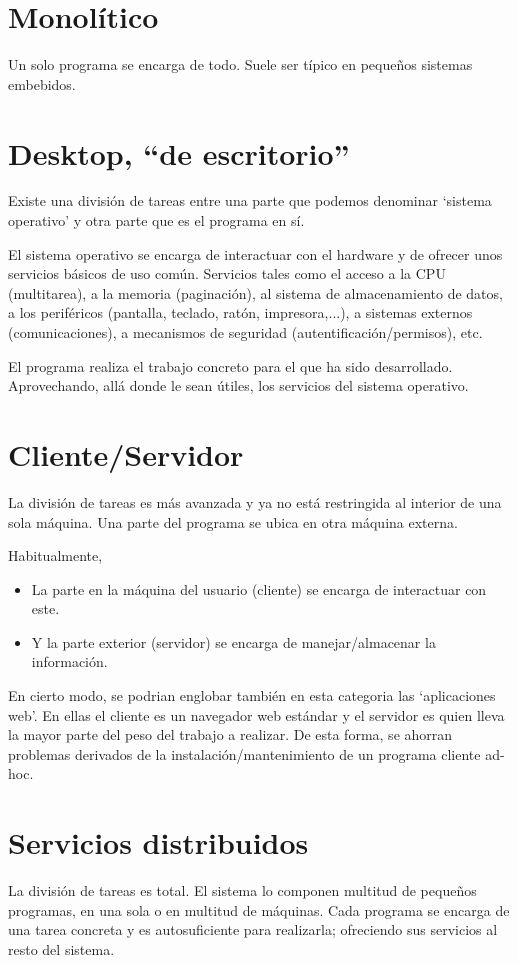 \documentclass[spanish,12pt,a4paper,final,oneside]{book}
\begin{document}
\section{Monolítico}
Un solo programa se encarga de todo. Suele ser típico en pequeños sistemas embebidos.

\section{Desktop, ``de escritorio''}
Existe una división de tareas entre una parte que podemos denominar `sistema operativo' y otra parte que es el programa en sí.

El sistema operativo se encarga de interactuar con el hardware y de ofrecer unos servicios básicos de uso común. Servicios tales como el acceso a la CPU (multitarea), a la memoria (paginación), al sistema de almacenamiento de datos, a los periféricos (pantalla, teclado, ratón, impresora,...), a sistemas externos (comunicaciones), a mecanismos de seguridad (autentificación/permisos), etc.

El programa realiza el trabajo concreto para el que ha sido desarrollado. Aprovechando, allá donde le sean útiles, los servicios del sistema operativo.

\section{Cliente/Servidor}
La división de tareas es más avanzada y ya no está restringida al interior de una sola máquina. Una parte del programa se ubica en otra máquina externa.

Habitualmente, 
\begin{itemize}
\item La parte en la máquina del usuario (cliente) se encarga de interactuar con este. 
\item Y la parte exterior (servidor) se encarga de manejar/almacenar la información.
\end{itemize}

En cierto modo, se podrian englobar también en esta categoria las `aplicaciones web'. En ellas el cliente es un navegador web estándar y el servidor es quien lleva la mayor parte del peso del trabajo a realizar. De esta forma, se ahorran problemas derivados de la instalación/mantenimiento de un programa cliente ad-hoc.

\section{Servicios distribuidos}
La división de tareas es total. El sistema lo componen multitud de pequeños programas, en una sola o en multitud de máquinas. Cada programa se encarga de una tarea concreta y es autosuficiente para realizarla; ofreciendo sus servicios al resto del sistema.
\end{document}

